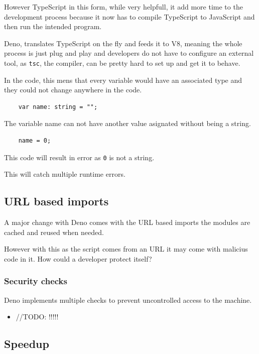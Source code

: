 \documentclass[12pt, letterpaper]{article}
\begin{document}
\begin{multicols}{2}
    However TypeScript in this form, while very helpfull, it add more time to the development process because it now has to compile TypeScript to JavaScript and then run the intended program.

    Deno, translates TypeScript on the fly and feeds it to V8, meaning the whole process is just plug and play and developers do not have to configure an external tool, as \verb|tsc|, the compiler, can be pretty hard to set up and get it to behave.

    In the code, this mens that every variable would have an associated type and they could not change anywhere in the code.

    \begin{lstlisting}
    var name: string = "";
    \end{lstlisting}

    The variable name can not have another value asignated without being a string.

    \begin{lstlisting}
    name = 0;
    \end{lstlisting}

    This code will result in error as \verb|0| is not a string.

    This will catch multiple runtime errors.

    \subsection{URL based imports}

    A major change with Deno comes with the URL based imports the modules are cached and reused when needed.

    However with this as the script comes from an URL it may come with malicius code in it. How could a developer protect itself?

    \subsubsection{Security checks}

    Deno implements multiple checks to prevent uncontrolled access to the machine.

    \begin{itemize}
        \item //TODO: !!!!!
    \end{itemize}


    \subsection{Speedup}


\end{multicols}
\end{document}

